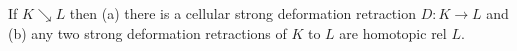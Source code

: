 If $K \searrow L$ then (a) there is a cellular strong deformation retraction $D: K \rightarrow L$ and (b) any two strong deformation retractions of $K$ to $L$ are homotopic rel $L$.
